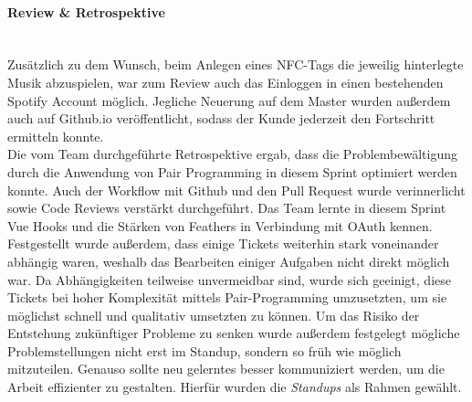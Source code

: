 \documentclass[10pt, a4paper]{article}
\begin{document}
\paragraph*{Review \& Retrospektive} $~$ \\
Zusätzlich zu dem Wunsch, beim Anlegen eines NFC-Tags die jeweilig hinterlegte Musik abzuspielen, war zum Review auch das Einloggen
in einen bestehenden Spotify Account möglich. Jegliche Neuerung auf dem Master wurden außerdem auch auf Github.io veröffentlicht, sodass der Kunde jederzeit
den Fortschritt ermitteln konnte.
\\
Die vom Team durchgeführte Retrospektive ergab, dass die Problembewältigung durch die Anwendung von Pair Programming in diesem Sprint optimiert werden konnte.
Auch der Workflow mit Github und den Pull Request wurde verinnerlicht sowie Code Reviews verstärkt durchgeführt. Das Team lernte in diesem Sprint
Vue Hooks und die Stärken von Feathers in Verbindung mit OAuth kennen. Festgestellt wurde außerdem, dass einige Tickets weiterhin stark voneinander abhängig waren,
weshalb das Bearbeiten einiger Aufgaben nicht direkt möglich war. Da Abhängigkeiten teilweise unvermeidbar sind, wurde sich geeinigt, diese Tickets bei hoher
Komplexität mittels Pair-Programming umzusetzten, um sie möglichst schnell und qualitativ umsetzten zu können. Um das Risiko der Entstehung zukünftiger Probleme
zu senken wurde außerdem festgelegt mögliche Problemstellungen nicht erst im Standup, sondern so früh wie möglich mitzuteilen. Genauso sollte neu gelerntes besser
kommuniziert werden, um die Arbeit effizienter zu gestalten. Hierfür wurden die \textit{Standups} als Rahmen gewählt.
\end{document}
